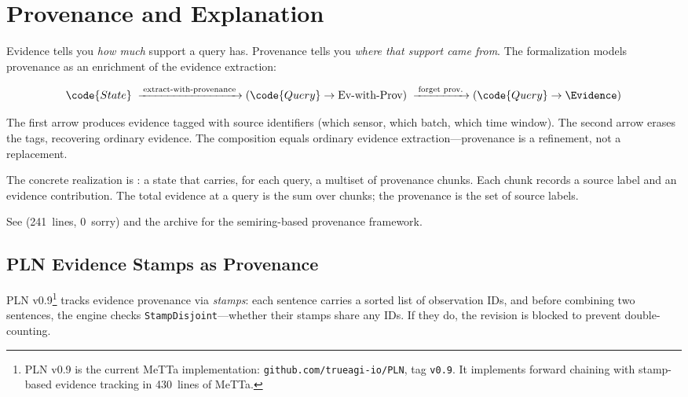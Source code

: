 \documentclass[11pt,openany]{report}
\begin{document}
\section{Provenance and Explanation}
\label{sec:provenance}

Evidence tells you \emph{how much} support a query has.  Provenance
tells you \emph{where that support came from}.  The formalization
models provenance as an enrichment of the evidence extraction:

\[
  \code{State}
  \;\xrightarrow{\;\text{extract-with-provenance}\;}
  (\code{Query} \to \text{Ev-with-Prov})
  \;\xrightarrow{\;\text{forget prov.}\;}
  (\code{Query} \to \Evidence)
\]

\noindent
The first arrow produces evidence tagged with source identifiers
(which sensor, which batch, which time window).  The second arrow
erases the tags, recovering ordinary evidence.  The composition
equals ordinary evidence extraction---provenance is a refinement,
not a replacement.

The concrete realization is : a state that
carries, for each query, a multiset of provenance chunks.  Each chunk
records a source label and an evidence contribution.  The total
evidence at a query is the sum over chunks; the provenance is the
set of source labels.


\noindent
See 
(241~lines, 0~sorry) and the 
archive for the semiring-based provenance framework.

\subsection{PLN Evidence Stamps as Provenance}
\label{sec:pln-stamps}

PLN v0.9\footnote{PLN v0.9 is the current MeTTa implementation:
\texttt{github.com/trueagi-io/PLN}, tag \texttt{v0.9}.  It implements
forward chaining with stamp-based evidence tracking in 430~lines of
MeTTa.} tracks evidence provenance via \emph{stamps}: each sentence
carries a sorted list of observation IDs, and before combining two
sentences, the engine checks \texttt{StampDisjoint}---whether their
stamps share any IDs.  If they do, the revision is blocked to prevent
double-counting.
\end{document}
